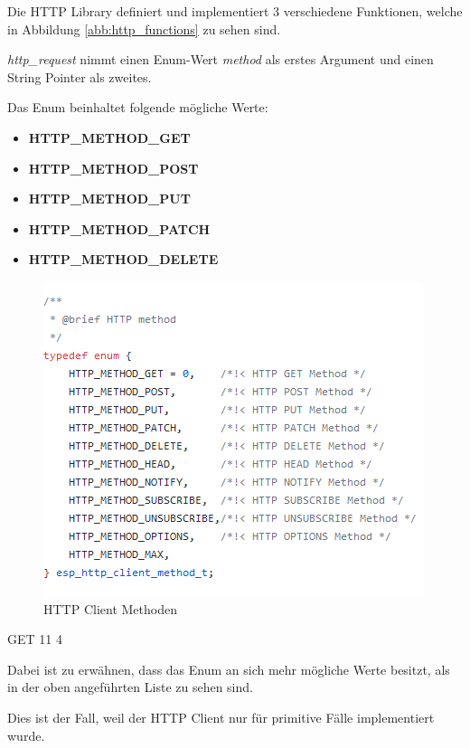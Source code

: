 Die HTTP Library definiert und implementiert 3 verschiedene Funktionen, welche in  Abbildung \ref{abb:http_functions} zu sehen sind.

\textit{http\_request} nimmt einen Enum-Wert \textit{method} als erstes Argument und einen String Pointer als zweites.

Das Enum beinhaltet folgende mögliche Werte:

\begin{itemize}
    \item \textbf{HTTP\_METHOD\_GET}
    \item \textbf{HTTP\_METHOD\_POST}
    \item \textbf{HTTP\_METHOD\_PUT}
    \item \textbf{HTTP\_METHOD\_PATCH}
    \item \textbf{HTTP\_METHOD\_DELETE}
\end{itemize}

\begin{figure}[H]
    \begin{center}
        \includegraphics[scale=1]{images/http_client_methods.png}
        \caption{HTTP Client Methoden}%
        \label{abb:http_client_methods}
    \end{center}    
\end{figure}


GET 11 4 

Dabei ist zu erwähnen, dass das Enum an sich mehr mögliche Werte besitzt, als in der oben angeführten Liste zu sehen sind.

Dies ist der Fall, weil der HTTP Client nur für primitive Fälle implementiert wurde.

